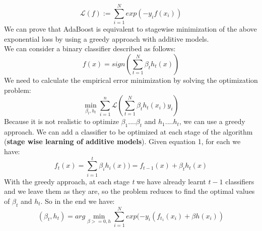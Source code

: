 \begin{equation*}
	\mathcal{L}(f) := \sum_{i=1}^{N} exp(-y_if(x_i))
\end{equation*}
We can prove that AdaBoost is equivalent to stagewise minimization of the above exponential loss by using a greedy approach with additive models.\\
We can consider a binary classifier described as follows:
\begin{equation}
	f (x)= sign(\sum_{t=1}^{N} \beta_th_t(x))
\end{equation}
We need to calculate the empirical error minimization by solving the optimization problem:
\begin{equation*}
	\min_{\beta_t,h_t} \sum_{i = 1}^{n}\mathcal{L}(\sum_{t =1}^{N}\beta_th_t(x_i)y_i)
\end{equation*}
Because it is not realistic to optimize $\beta_1....\beta_t$ and $h_1....h_t$, we can use a greedy approach.
We can add a classifier to be optimized at each stage of the algorithm (\textbf{stage wise learning of additive models}). Given equation 1, for each  we have:
\begin{equation*}
	f_t(x)= \sum_{i=1}^{t} \beta_ih_i(x)) = f_{t-1}(x) + \beta_th_t(x)
\end{equation*}
With the greedy approach, at each stage \textit{t} we have already learnt \textit{$t-1$} classifiers and we leave them as they are, so the problem reduces to find the optimal values of $\beta_t$ and $h_t$. So in the end we have:
\begin{equation*}
	(\beta_t, h_t) = arg \min_{\beta>=0,h}\sum_{i=1}^{N}exp(-y_i(f_{t_1}(x_i) + \beta h(x_i))
\end{equation*}